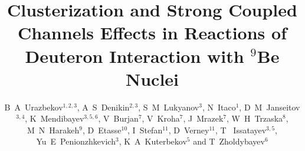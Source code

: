 \documentclass[10pt]{iopart}
\begin{document}
\title[B A Urazbekov \etal ]{
Clusterization and Strong Coupled Channels  Effects in Reactions of Deuteron Interaction with $^9$Be Nuclei
}

\author{B~A~Urazbekov$^{1,2,3}$, A~S~Denikin$^{2,3}$, S~M~Lukyanov$^3$,  N~Itaco$^1$,  D~M~Janseitov$^{3,4}$, K~Mendibayev$^{3,5,6}$, V~Burjan$^7$, V~Kroha$^7$, J~Mrazek$^7$, W~H~Trzaska$^8$, M~N~Harakeh$^9$, D~Etasse$^{10}$, I~Stefan$^{11}$, D~Verney$^{11}$, T~ Issatayev$^{3,5}$, Yu~E~Penionzhkevich$^{3}$, K~A~Kuterbekov$^{5}$ and T~Zholdybayev$^{6}$}

\address{$^1$ Dipartimento di Matematica e Fisica,
Universit\`{a} degli Studi della Campania “Luigi Vanvitelli”, I-8110 Caserta, Italy}
\address{$^2$ Dubna State University, 141982 Dubna, Russia}
\address{$^3$ Joint Institute for nuclear research,  141980 Dubna, Russia}
\address{$^4$ Al-Farabi Kazakh National University, 050040 Almaty, Kazakhstan }
\address{$^5$ L~N~Gumilyov Eurasian National University, 010008 Astana, Kazakhstan }
\address{$^6$ Institute of Nuclear Physics, 050032 Almaty, Kazakhstan}
\address{$^7$ Nuclear Physics Institute CAS, 25068 \v{R}e\v{z}, Czech Republic}
\address{$^8$ Department of Physics, University of Jyv\"askyl\"a, FIN-40014 Jyv\"askyl\"a, Finland}
\address{$^9$ KVI-CART, University of Groningen, 9747 AA Groningen, The Netherlands}
\address{$^{10}$ Normandie Universit\'{e}, ENSICAEN, UNICAEN, CNRS/IN2P3, LPC Caen, 14000 Caen, France}
\address{$^{11}$ Institut de Physique Nucl\'{e}aire, Univ. Paris-Sud, Universit\'{e} Paris-Saclay, F-91406 Orsay, France}
\end{document}
